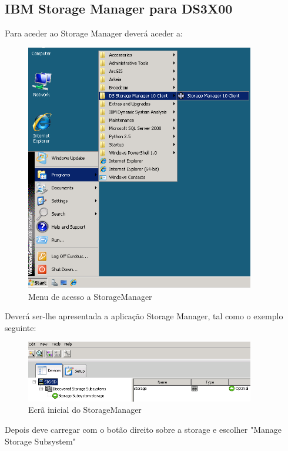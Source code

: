 \subsection{IBM Storage Manager para DS3X00}

Para aceder ao Storage Manager deverá aceder a:

\begin{figure}[H]
    \begin{center}
        \includegraphics[width=10cm]{include/img/ds3000_win_1}
    \end{center}
    \caption{Menu de acesso a StorageManager}
    \label{fig:ds3000-win-1}
\end{figure}

Deverá ser-lhe apresentada a aplicação Storage Manager, tal como o exemplo seguinte:

\begin{figure}[H]
    \begin{center}
        \includegraphics[width=10cm]{include/img/ds3000_win_2}
    \end{center}
    \caption{Ecrã inicial do StorageManager}
    \label{fig:ds3000-win-2}
\end{figure}

Depois deve carregar com o botão direito sobre a storage e escolher "Manage Storage Subsystem"

